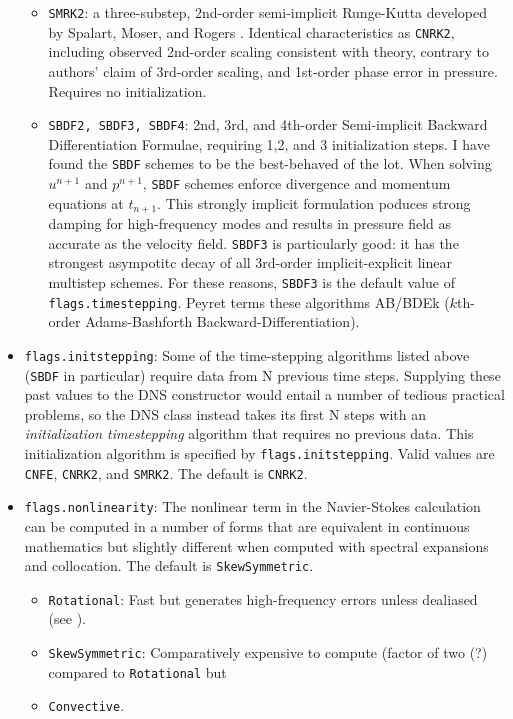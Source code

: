 \documentclass{article}[12pt]
\begin{document}
\begin{itemize}
\begin{itemize}
  \item {\tt SMRK2}: a three-substep, 2nd-order semi-implicit Runge-Kutta
  developed by Spalart, Moser, and Rogers \cite{Spalart91}. Identical
  characteristics as {\tt CNRK2}, including observed 2nd-order scaling
  consistent with theory, contrary to authors' claim of 3rd-order scaling,
  and 1st-order phase error in pressure. Requires no initialization.
  \item {\tt SBDF2, SBDF3, SBDF4}: 2nd, 3rd, and 4th-order Semi-implicit
  Backward Differentiation Formulae, requiring 1,2, and 3 initialization
  steps. I have found the {\tt SBDF} schemes to be the best-behaved of the
  lot. When solving $u^{n+1}$ and $p^{n+1}$, {\tt SBDF} schemes enforce
  divergence and momentum equations at $t_{n+1}$. This strongly implicit
  formulation poduces strong damping for high-frequency modes and results
  in pressure field as accurate as the velocity field. {\tt SBDF3} is
  particularly good: it has the strongest asympotitc decay of all 3rd-order
  implicit-explicit linear multistep schemes. For these reasons, {\tt SBDF3}
  is the default value of {\tt flags.timestepping}.
    Peyret terms these algorithms AB/BDEk ($k$th-order Adams-Bashforth
  Backward-Differentiation).
\end{itemize}
\item {\tt flags.initstepping}: Some of the time-stepping algorithms listed
above ({\tt SBDF} in particular) require data from N previous time steps.
Supplying these past values to the DNS constructor would entail a number
of tedious practical problems, so the DNS class instead takes its first N
steps with an {\em initialization timestepping} algorithm that
requires no previous data. This initialization algorithm is specified by
{\tt flags.initstepping}. Valid values are {\tt CNFE}, {\tt CNRK2}, and
{\tt SMRK2}. The default is {\tt CNRK2}.
\item {\tt flags.nonlinearity}: The nonlinear term in the Navier-Stokes
calculation can be computed in a number of forms that are equivalent in
continuous mathematics but slightly different when computed with spectral
expansions and collocation. The default is {\tt SkewSymmetric}.
\begin{itemize}
  \item {\tt Rotational}: Fast but generates high-frequency errors unless
  dealiased (see \cite{Zang91}).
  \item {\tt SkewSymmetric}: Comparatively expensive to compute (factor of
  two (?) compared to {\tt Rotational} but
  \item {\tt Convective}.

\end{itemize}
\end{itemize}
\end{document}
